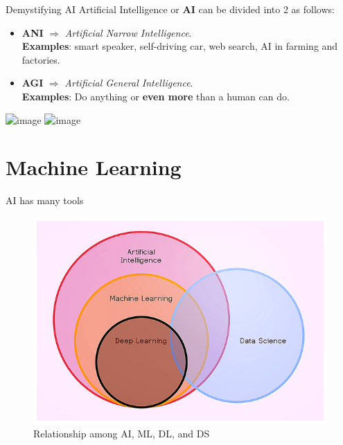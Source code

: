 \documentclass[pdf]{beamer}
\theoremstyle{mystyle}
\begin{document}
\begin{frame}{Demystifying AI}
	Artificial Intelligence or \textbf{AI} can be divided into 2 as follows:
	\begin{itemize}
		\item<2-> \textbf{ANI} $\Rightarrow$ \textit{Artificial Narrow Intelligence}. \\
		\textbf{Examples}: smart speaker, self-driving car, web search, AI in farming and factories.
		\bigskip
		\item<3-> \textbf{AGI} $\Rightarrow$ \textit{Artificial General Intelligence}. \\
		\textbf{Examples}: Do anything or \textbf{even more} than a human can do.
	\end{itemize}
	\begin{center}
		\includegraphics<3->[scale=.125]{ex-machina} \qquad \includegraphics<3->[scale=.125]{upgrade}
	\end{center}
\end{frame}

\section{Machine Learning}
\begin{frame}{AI has many tools}
	\begin{figure}[!ht]
		\centering
		\includegraphics[scale=.45]{diagram-venn-deep-learning}
		\caption{Relationship among AI, ML, DL, and DS~\citep{kharkovyna2019ABeginnersGuide}}
	\end{figure}
\end{frame}
\end{document}
